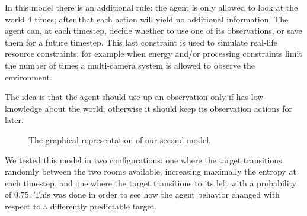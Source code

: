 In this model there is an additional rule: the agent is only allowed to look at the world 4 times;
after that each action will yield no additional information. The agent can, at each timestep, decide
whether to use one of its observations, or save them for a future timestep. This last constraint is
used to simulate real-life resource constraints; for example when energy and/or processing
constraints limit the number of times a multi-camera system is allowed to observe the environment.

The idea is that the agent should use up an observation only if has low knowledge about the world;
otherwise it should keep its observation actions for later.

\begin{figure}[ht]
\centering
{}
\caption{The graphical representation of our second model.}
\label{ref:finbudget1}
\end{figure}

We tested this model in two configurations: one where the target transitions randomly between the
two rooms available, increasing maximally the entropy at each timestep, and one where the target
transitions to its left with a probability of $0.75$. This was done in order to see how the agent behavior
changed with respect to a differently predictable target.

